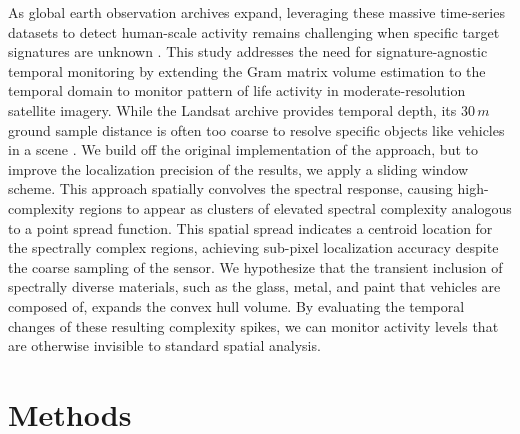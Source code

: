 \documentclass[conference,a4paper]{IEEEtran}
\begin{document}
As global earth observation archives expand, leveraging these massive time-series datasets to detect human-scale activity remains challenging when specific target signatures are unknown \cite{chi_big_2016, zhu_continuous_2020}. This study addresses the need for signature-agnostic temporal monitoring by extending %
the Gram matrix volume estimation to the temporal domain to monitor pattern of life activity in moderate-resolution satellite imagery. While the Landsat archive provides temporal depth, its $30\,m$ ground sample distance is often too coarse to resolve specific objects like vehicles in a scene \cite{xiaolu_change_2011}. We build off the original implementation of the approach, but to improve the localization precision of the results, we apply a sliding window scheme. This approach spatially convolves the spectral response, causing high-complexity regions to appear as clusters of elevated spectral complexity analogous to a point spread function. This spatial spread indicates a centroid location for the spectrally complex regions, achieving sub-pixel localization accuracy despite the coarse sampling of the sensor. We hypothesize that the transient inclusion of spectrally diverse materials, such as the glass, metal, and paint that vehicles are composed of, expands the convex hull volume. By evaluating the temporal changes of these resulting complexity spikes, we can monitor activity levels that are otherwise invisible to standard spatial analysis.

\section{Methods}
\end{document}
